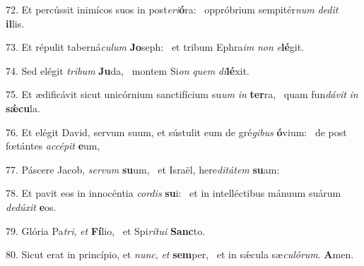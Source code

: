 72. Et percússit inimícos suos in post\textit{e}\textit{ri}\textbf{ó}ra: \ast\  oppróbrium sempitér\textit{num} \textit{de}\textit{dit} \textbf{il}lis.\

73. Et répulit taberná\textit{cu}\textit{lum} \textbf{Jo}seph: \ast\  et tribum Ephra\textit{im} \textit{non} \textit{e}\textbf{lé}git.\

74. Sed elégit \textit{tri}\textit{bum} \textbf{Ju}da, \ast\  montem Si\textit{on} \textit{quem} \textit{di}\textbf{lé}xit.\

75. Et ædificávit sicut unicórnium sanctifícium su\textit{um} \textit{in} \textbf{ter}ra, \ast\  quam fun\textit{dá}\textit{vit} \textit{in} \textbf{sǽ}\textbf{cu}la.\

76. Et elégit David, servum suum, et sústulit eum de gré\textit{gi}\textit{bus} \textbf{ó}vium: \ast\  de post fœtántes \textit{ac}\textit{cé}\textit{pit} \textbf{e}um,\

77. Páscere Jacob, \textit{ser}\textit{vum} \textbf{su}um, \ast\  et Israël, here\textit{di}\textit{tá}\textit{tem} \textbf{su}am:\

78. Et pavit eos in innocéntia \textit{cor}\textit{dis} \textbf{su}i: \ast\  et in intelléctibus mánuum suárum \textit{de}\textit{dú}\textit{xit} \textbf{e}os.\

79. Glória Pa\textit{tri}, \textit{et} \textbf{Fí}lio, \ast\  et Spi\textit{rí}\textit{tu}\textit{i} \textbf{Sanc}to.\

80. Sicut erat in princípio, et \textit{nunc}, \textit{et} \textbf{sem}per, \ast\  et in sǽcula sæ\textit{cu}\textit{ló}\textit{rum}. \textbf{A}men.\

